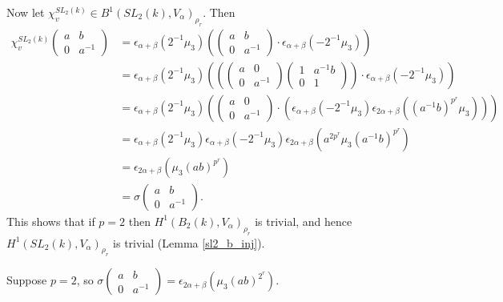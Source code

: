 Now let $\chi^{SL_2(k)}_v\in B^1(SL_2(k), V_\alpha)_{\rho_r}$. Then
\begin{align*}
	\chi^{SL_2(k)}_v\left(\begin{matrix}a & b\\0 & a^{-1}\end{matrix}\right) &= 
	\epsilon_{\alpha+\beta}(2^{-1}\mu_3)\left(\left(\begin{matrix}a & b\\0 & a^{-1}\end{matrix}\right)
		\cdot \epsilon_{\alpha+\beta}(-2^{-1}\mu_3)\right) \\
	&= \epsilon_{\alpha+\beta}(2^{-1}\mu_3)\left(\left(\left(\begin{matrix}a & 0\\0 & a^{-1}\end{matrix}\right)\left(\begin{matrix}1 & a^{-1}b\\0 & 1\end{matrix}\right)\right)
		\cdot \epsilon_{\alpha+\beta}(-2^{-1}\mu_3)\right) \\
	&= \epsilon_{\alpha+\beta}(2^{-1}\mu_3)\left(\left(\begin{matrix}a & 0\\0 & a^{-1}\end{matrix}\right)
		\cdot \left(
			\epsilon_{\alpha+\beta}(-2^{-1}\mu_3)
			\epsilon_{2\alpha+\beta}((a^{-1}b)^{p^r}\mu_3)\right)\right) \\
	&= \epsilon_{\alpha+\beta}(2^{-1}\mu_3)
			\epsilon_{\alpha+\beta}(-2^{-1}\mu_3)
			\epsilon_{2\alpha+\beta}(a^{2 p^r}\mu_3(a^{-1}b)^{p^r}) \\
	&= \epsilon_{2\alpha+\beta}(\mu_3(ab)^{p^r}) \\
	&= \sigma\left(\begin{matrix}a & b\\0 & a^{-1}\end{matrix}\right).
\end{align*}
This shows that if $p=2$ then $H^1(B_2(k), V_\alpha)_{\rho_r}$ is trivial, and hence $H^1(SL_2(k), V_\alpha)_{\rho_r}$ is trivial (Lemma \ref{sl2_b_inj}).

Suppose $p=2$, so $\sigma\left(\begin{matrix}a & b\\0 & a^{-1}\end{matrix}\right) = \epsilon_{2\alpha+\beta}(\mu_3(ab)^{2^r})$.


